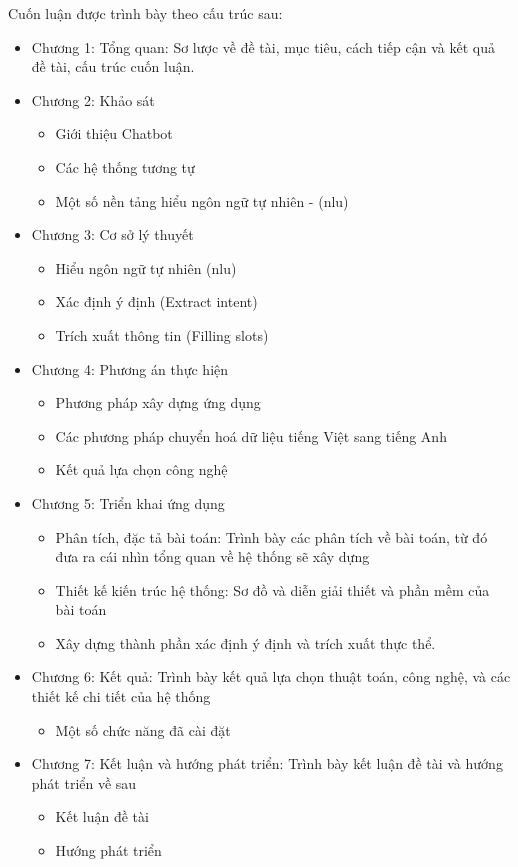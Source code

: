 Cuốn luận được trình bày theo cấu trúc sau:
\begin{itemize}
    \item Chương 1: Tổng quan: Sơ lược về đề tài, mục tiêu, cách tiếp cận và kết quả đề tài, cấu trúc cuốn luận.
    \item Chương 2: Khảo sát
          \begin{itemize}
              \item Giới thiệu Chatbot
              \item Các hệ thống tương tự
              \item Một số nền tảng hiểu ngôn ngữ tự nhiên - (\ac{nlu})
          \end{itemize}
    \item Chương 3: Cơ sở lý thuyết
          \begin{itemize}
              \item Hiểu ngôn ngữ tự nhiên (\ac{nlu})
              \item Xác định ý định (Extract intent)
              \item Trích xuất thông tin (Filling slots)
          \end{itemize}
    \item Chương 4: Phương án thực hiện
    \begin{itemize}
        \item Phương pháp xây dựng ứng dụng
        \item Các phương pháp chuyển hoá dữ liệu tiếng Việt sang tiếng Anh
        \item Kết quả lựa chọn công nghệ
    \end{itemize}
    \item Chương 5: Triển khai ứng dụng
          \begin{itemize}
              \item Phân tích, đặc tả bài toán: Trình bày các phân tích về bài toán, từ đó đưa ra cái nhìn tổng quan về hệ thống sẽ xây dựng
              \item Thiết kế kiến trúc hệ thống: Sơ đồ và diễn giải thiết và phần mềm của bài toán
              \item Xây dựng thành phần xác định ý định và trích xuất thực thể.
          \end{itemize}
    \item Chương 6: Kết quả: Trình bày kết quả lựa chọn thuật toán, công nghệ, và các thiết kế chi tiết của hệ thống
          \begin{itemize}
              \item Một số chức năng đã cài đặt
          \end{itemize}
    \item Chương 7: Kết luận và hướng phát triển: Trình bày kết luận đề tài và hướng phát triển về sau
          \begin{itemize}
              \item Kết luận đề tài
              \item Hướng phát triển
          \end{itemize}
\end{itemize}